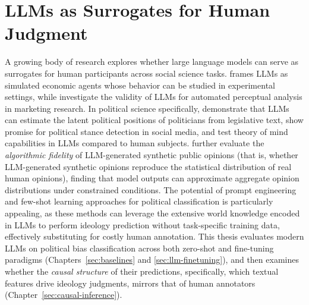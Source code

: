 \section{LLMs as Surrogates for Human Judgment}
\label{sec:rw-llm-surrogates}

A growing body of research explores whether large language models can serve as surrogates for human participants across social science tasks. \citet{horton2023large} frames LLMs as simulated economic agents whose behavior can be studied in experimental settings, while \citet{li2024frontiers} investigate the validity of LLMs for automated perceptual analysis in marketing research. In political science specifically, \citet{wu2023large} demonstrate that LLMs can estimate the latent political positions of politicians from legislative text, \citet{ibrahim2024analyzingpoliticalstancestwitter} show promise for political stance detection in social media, and \citet{strachan2024testing} test theory of mind capabilities in LLMs compared to human subjects. \citet{ma-etal-2025-algorithmic} further evaluate the \emph{algorithmic fidelity} of LLM-generated synthetic public opinions (that is, whether LLM-generated synthetic opinions reproduce the statistical distribution of real human opinions), finding that model outputs can approximate aggregate opinion distributions under constrained conditions. The potential of prompt engineering and few-shot learning approaches for political classification is particularly appealing, as these methods can leverage the extensive world knowledge encoded in LLMs to perform ideology prediction without task-specific training data, effectively substituting for costly human annotation. This thesis evaluates modern LLMs on political bias classification across both zero-shot and fine-tuning paradigms (Chapters~\ref{sec:baselines} and \ref{sec:llm-finetuning}), and then examines whether the \textit{causal structure} of their predictions, specifically, which textual features drive ideology judgments, mirrors that of human annotators (Chapter~\ref{sec:causal-inference}).


